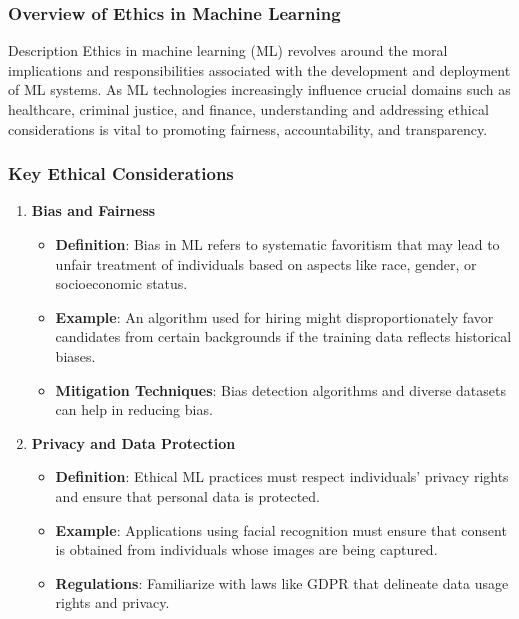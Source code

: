 \documentclass[aspectratio=169]{beamer}
\begin{document}
\begin{frame}[fragile]
    \frametitle{Overview of Ethics in Machine Learning}
    \begin{block}{Description}
    Ethics in machine learning (ML) revolves around the moral implications and responsibilities associated with the development and deployment of ML systems. As ML technologies increasingly influence crucial domains such as healthcare, criminal justice, and finance, understanding and addressing ethical considerations is vital to promoting fairness, accountability, and transparency.
    \end{block}
\end{frame}

\begin{frame}[fragile]
    \frametitle{Key Ethical Considerations}
    \begin{enumerate}
        \item \textbf{Bias and Fairness}
            \begin{itemize}
                \item \textbf{Definition}: Bias in ML refers to systematic favoritism that may lead to unfair treatment of individuals based on aspects like race, gender, or socioeconomic status.
                \item \textbf{Example}: An algorithm used for hiring might disproportionately favor candidates from certain backgrounds if the training data reflects historical biases.
                \item \textbf{Mitigation Techniques}: Bias detection algorithms and diverse datasets can help in reducing bias.
            \end{itemize}

        \item \textbf{Privacy and Data Protection}
            \begin{itemize}
                \item \textbf{Definition}: Ethical ML practices must respect individuals' privacy rights and ensure that personal data is protected.
                \item \textbf{Example}: Applications using facial recognition must ensure that consent is obtained from individuals whose images are being captured.
                \item \textbf{Regulations}: Familiarize with laws like GDPR that delineate data usage rights and privacy.
            \end{itemize}
    \end{enumerate}
\end{frame}
\end{document}
